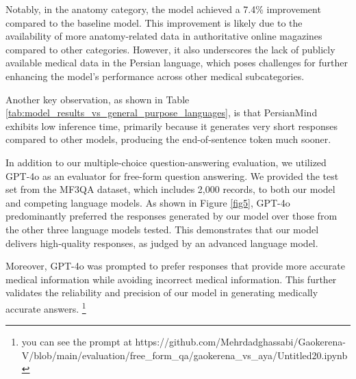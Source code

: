 \documentclass[conference]{IEEEtran}
\begin{document}
Notably, in the anatomy category, the model achieved a 7.4\% improvement compared to the baseline model. This improvement is likely due to the availability of more anatomy-related data in authoritative online magazines compared to other categories. However, it also underscores the lack of publicly available medical data in the Persian language, which poses challenges for further enhancing the model’s performance across other medical subcategories.

Another key observation, as shown in Table \ref{tab:model_results_vs_general_purpose_languages}, is that PersianMind exhibits low inference time, primarily because it generates very short responses compared to other models, producing the end-of-sentence token much sooner.

In addition to our multiple-choice question-answering evaluation, we utilized GPT-4o \cite{b33} as an evaluator for free-form question answering. We provided the test set from the MF3QA dataset, which includes 2,000 records, to both our model and competing language models. As shown in Figure \ref{fig5}, GPT-4o predominantly preferred the responses generated by our model over those from the other three language models tested. This demonstrates that our model delivers high-quality responses, as judged by an advanced language model.

Moreover, GPT-4o was prompted to prefer responses that provide more accurate medical information while avoiding incorrect medical information. This further validates the reliability and precision of our model in generating medically accurate answers.
\footnote{you can see the prompt at https://github.com/Mehrdadghassabi/Gaokerena-V/blob/main/evaluation/free\_form\_qa/gaokerena\_vs\_aya/Untitled20.ipynb}
\end{document}
